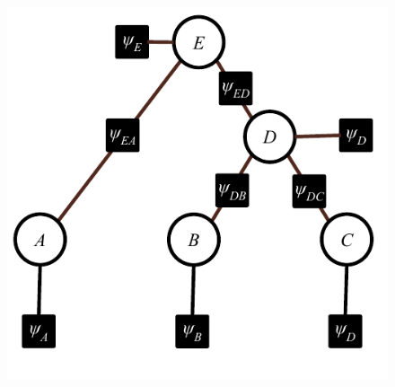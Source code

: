 \documentclass[11pt,addpoints,answers]{exam}
\numberwithin{equation}{section} %
\numberwithin{figure}{section} %
\numberwithin{table}{section} %
\begin{document}
\noindent
\begin{minipage}{.4\textwidth}

\begin{figure}[H]
    \centering
    \includegraphics[width=\textwidth]{fig/hw2_tree_binary.pdf}
    \caption{}
    \label{fig:tree_abcde}
\end{figure}

\end{minipage}%
\end{document}
